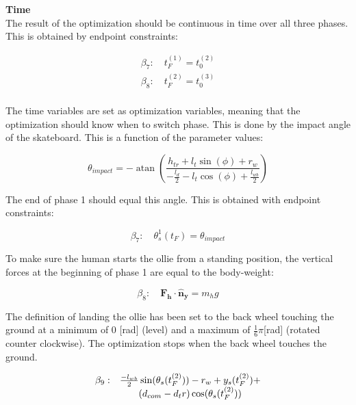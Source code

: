 \documentclass[default,iicol]{sn-jnl}
\theoremstyle{thmstyleone}%
\theoremstyle{thmstyletwo}%
\theoremstyle{thmstylethree}%
\begin{document}
\textbf{Time}\\
The result of the optimization should be continuous in time over all three phases. This is obtained by endpoint constraints: 

\begin{equation}
    \begin{array}{c}
         \beta_7: \quad t_F^{(1)} = t_0^{(2)}  \\
         \beta_8: \quad t_F^{(2)} = t_0^{(3)}  \\
    \end{array}
\end{equation}

The time variables are set as optimization variables, meaning that the optimization should know when to switch phase. This is done by the impact angle of the skateboard. This is a function of the parameter values:

\begin{equation}
    \theta_{impact} = -\operatorname{atan}\left(\frac{h_{t r}+l_t \sin (\phi)+r_w}{-\frac{l_d}{2}-l_t \cos (\phi)+\frac{l_{w b}}{2}}\right)
\end{equation}

The end of phase 1 should equal this angle. This is obtained with endpoint constraints:

\begin{equation}
    \beta_7: \quad \theta_s^{1}(t_F) = \theta_{impact}
\end{equation}

To make sure the human starts the ollie from a standing position, the vertical forces at the beginning of phase 1 are equal to the body-weight:

\begin{equation}
    \beta_8: \quad \mathbf{F_h} \cdot \mathbf{\hat n_y} = m_h g
\end{equation}

The definition of landing the ollie has been set to the back wheel touching the ground at a minimum of 0 [rad] (level) and a maximum of $\frac{1}{6} \pi$[rad] (rotated counter clockwise). The optimization stops when the back wheel touches the ground.

\begin{equation}
\begin{array}{l c}
\beta_9 : & \frac{-l_{wb}}{2} \sin(\theta_s(t_F^{(2)})) - r_w + y_s(t_F^{(2)}) + \\ 
& (d_{com} - {d_tr}) \cos(\theta_s(t_F^{(2)}))
\end{array}
\end{equation}
\end{document}
